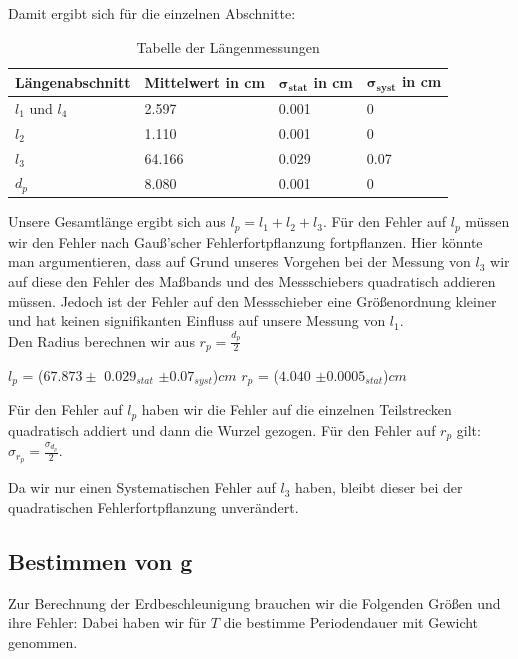\documentclass[twoside]{protokoll}
\begin{document}
Damit ergibt sich für die einzelnen Abschnitte:

\begin{table}[H]
        \centering
        \begin{tabularx}{1.0\textwidth}{X X X X} %
            \toprule
            \textbf{Längenabschnitt} & \textbf{Mittelwert in cm} & $\mathbf{\sigma_{stat}}$ in cm & $\mathbf{\sigma_{syst}}$ in cm\\
            \midrule
            $l_1$ und $l_4$ & 2.597 & 0.001 & 0 \\
            $l_2$ & 1.110 & 0.001 & 0\\
            $l_3$ & 64.166 & 0.029 & 0.07\\
            $d_p$ & 8.080 & 0.001 & 0\\
            \bottomrule
        \end{tabularx}
        \caption{Tabelle der Längenmessungen}
        \label{tab:längen un fehler}
    \end{table}

Unsere Gesamtlänge ergibt sich aus $l_p = l_1 + l_2 + l_3$. Für den Fehler auf $l_p$ müssen wir den Fehler nach Gauß'scher Fehlerfortpflanzung fortpflanzen. 
Hier könnte man argumentieren, dass auf Grund unseres Vorgehen bei der Messung von $l_3$ wir auf diese den Fehler des Maßbands und des Messschiebers quadratisch addieren müssen.
Jedoch ist der Fehler auf den Messschieber eine Größenordnung kleiner und hat keinen signifikanten Einfluss auf unsere Messung von $l_1$.\\
Den Radius berechnen wir aus $r_p = \frac{d_p}{2}$
\begin{center}
$l_p$ = ($67.873 \pm$ $0.029_{stat}$ $\pm 0.07_{syst}$)$cm$   \qquad $r_p$ = ($4.040$ $\pm 0.0005_{stat}$)$cm$
\end{center}

Für den Fehler auf $l_p$ haben wir die Fehler auf die einzelnen Teilstrecken quadratisch addiert und dann die Wurzel gezogen.
Für den Fehler auf $r_p$  gilt: $\sigma_{r_p} =\frac{\sigma_{d_p}}{2}$.

Da wir nur einen Systematischen Fehler auf $l_3$ haben, bleibt dieser bei der quadratischen Fehlerfortpflanzung unverändert.

\subsection{Bestimmen von g}

Zur Berechnung der Erdbeschleunigung brauchen wir die Folgenden Größen und ihre Fehler:
Dabei haben wir für $T$ die bestimme Periodendauer mit Gewicht genommen.
 
\end{document}
